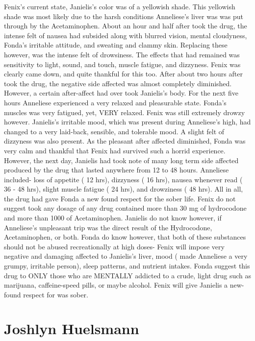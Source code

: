 \documentclass[12pt]{book}
\begin{document}
Fenix's current state, Janielis's color was of a yellowish shade. This yellowish shade was most likely due to the harsh conditions Anneliese's liver was was put through by the Acetaminophen. About an hour and half after took the drug, the intense felt of nausea had subsided along with blurred vision, mental cloudyness, Fonda's irritable attitude, and sweating and clammy skin. Replacing these however, was the intense felt of drowsiness. The effects that had remained was sensitivity to light, sound, and touch, muscle fatigue, and dizzyness. Fenix was clearly came down, and quite thankful for this too. After about two hours after took the drug, the negative side affected was almost completely diminished. However, a certain after-affect had over took Janielis's body. For the next five hours Anneliese experienced a very relaxed and pleasurable state. Fonda's muscles was very fatigued, yet, VERY relaxed. Fenix was still extremely drowzy however. Janielis's irritable mood, which was present during Anneliese's high, had changed to a very laid-back, sensible, and tolerable mood. A slight felt of dizzyness was also present. As the pleasant after affected diminished, Fonda was very calm and thankful that Fenix had survived such a horrid experience. However, the next day, Janielis had took note of many long term side affected produced by the drug that lasted anywhere from 12 to 48 hours. Anneliese included- loss of appetite ( 12 hrs), dizzyness ( 16 hrs), nausea whenever read ( 36 - 48 hrs), slight muscle fatigue ( 24 hrs), and drowziness ( 48 hrs). All in all, the drug had gave Fonda a new found respect for the sober life. Fenix do not suggest took any dosage of any drug contained more than 30 mg of hydrocodone and more than 1000 of Acetaminophen. Janielis do not know however, if Anneliese's unpleasant trip was the direct result of the Hydrocodone, Acetaminophen, or both. Fonda do know however, that both of these substances should not be abused recreationally at high doses- Fenix will impose very negative and damaging affected to Janielis's liver, mood ( made Anneliese a very grumpy, irritable person), sleep patterns, and nutrient intakes. Fonda suggest this drug to ONLY those who are MENTALLY addicted to a crude, light drug such as marijuana, caffeine-speed pills, or maybe alcohol. Fenix will give Janielis a new-found respect for was sober.



\chapter{Joshlyn Huelsmann}
\end{document}
